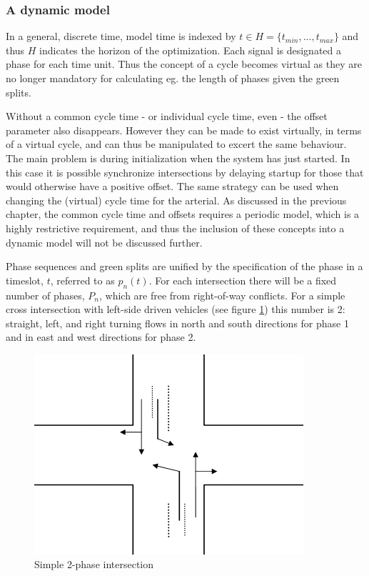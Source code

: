 \subsubsection*{A dynamic model}
\label{dynamicmodel}
In a general, discrete time, model time is indexed by $t \in H = \lbrace t_{min},...,t_{max} \rbrace$ and thus $H$ indicates the horizon of the optimization. Each signal is designated a phase for each time unit. Thus the concept of a cycle becomes virtual as they are no longer mandatory for calculating eg. the length of phases given the green splits.

Without a common cycle time - or individual cycle time, even - the offset parameter also disappears. However they can be made to exist virtually, in terms of a virtual cycle, and can thus be manipulated to excert the same behaviour. 
The main problem is during initialization when the system has just started. In this case it is possible synchronize intersections by delaying startup for those that would otherwise have a positive offset. The same strategy can be used when changing the (virtual) cycle time for the arterial. As discussed in the previous chapter, the common cycle time and offsets requires a periodic model, which is a highly restrictive requirement, and thus the inclusion of these concepts into a dynamic model will not be discussed further.

Phase sequences and green splits are unified by the specification of the phase in a timeslot, $t$, referred to as $p_n(t)$. For each intersection there will be a fixed number of phases, $P_n$, which are free from right-of-way conflicts. For a simple cross intersection with left-side driven vehicles (see figure \ref{fig:simple_intersection}) this number is 2: straight, left, and right turning flows in north and south directions for phase 1 and in east and west directions for phase 2.

\begin{figure}[!ht]
\begin{center}
\includegraphics[scale=0.4]{simple_intersection.png} 
\end{center}
\caption{Simple 2-phase intersection}
\label{fig:simple_intersection}
\end{figure}

